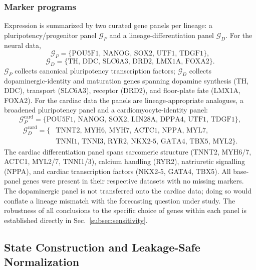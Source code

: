 \documentclass[pdflatex,sn-mathphys-num]{sn-jnl}
\theoremstyle{thmstyleone}%
\theoremstyle{thmstyletwo}%
\theoremstyle{thmstylethree}%
\begin{document}
\subsubsection{Marker programs} Expression is summarized by two curated gene panels per lineage: a pluripotency/progenitor panel $\mathcal{G}_P$ and a lineage-differentiation panel $\mathcal{G}_D$. For the neural data,
\[
\mathcal{G}_P=\{\mathrm{POU5F1,\,NANOG,\,SOX2,\,UTF1,\,TDGF1}\},
\]
\[
\mathcal{G}_D=\{\mathrm{TH,\,DDC,\,SLC6A3,\,DRD2,\,LMX1A,\,FOXA2}\}.
\]
$\mathcal{G}_P$ collects canonical pluripotency transcription factors; $\mathcal{G}_D$ collects dopaminergic-identity and maturation genes spanning dopamine synthesis (\textrm{TH, DDC}), transport (\textrm{SLC6A3}), receptor (\textrm{DRD2}), and floor-plate fate (\textrm{LMX1A, FOXA2}). For the cardiac data the panels are lineage-appropriate analogues, a broadened pluripotency panel and a cardiomyocyte-identity panel:
\[
\mathcal{G}_P^{\mathrm{card}}=\{\mathrm{POU5F1,\,NANOG,\,SOX2,\,LIN28A,\,DPPA4,\,UTF1,\,TDGF1}\},
\]
\begin{align*}
\mathcal{G}_D^{\mathrm{card}}=\{&\mathrm{TNNT2,\,MYH6,\,MYH7,\,ACTC1,\,NPPA,\,MYL7,}\\
&\mathrm{TNNI1,\,TNNI3,\,RYR2,\,NKX2\text{-}5,\,GATA4,\,TBX5,\,MYL2}\}.
\end{align*}
The cardiac differentiation panel spans sarcomeric structure (\textrm{TNNT2, MYH6/7, ACTC1, MYL2/7, TNNI1/3}), calcium handling (\textrm{RYR2}), natriuretic signalling (\textrm{NPPA}), and cardiac transcription factors (\textrm{NKX2-5, GATA4, TBX5}). All base-panel genes were present in their respective datasets with no missing markers. The dopaminergic panel is not transferred onto the cardiac data; doing so would conflate a lineage mismatch with the forecasting question under study. The robustness of all conclusions to the specific choice of genes within each panel is established directly in Sec.~\ref{subsec:sensitivity}.

\subsection{\textbf{State Construction and Leakage-Safe Normalization}}
\label{subsec:state}
\end{document}
